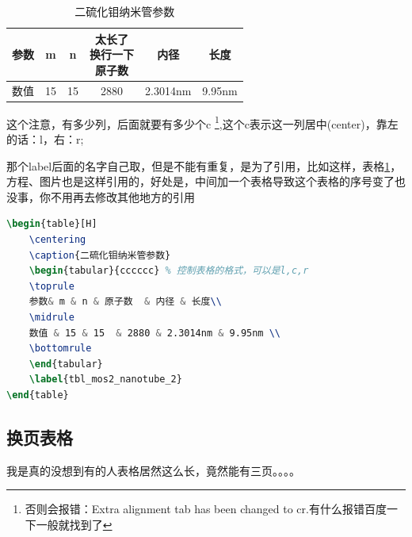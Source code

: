 \documentclass[AutoFakeBold]{LZUThesis2007}
\begin{document}
\begin{table}[H]
    \centering
    \caption{二硫化钼纳米管参数}
    \begin{tabular}{cccccc} %
    \toprule
    参数& m & n & \tabincell{c}{太长了\\换行一下\\原子数}  & 内径 & 长度\\
    \midrule
    数值 & 15 & 15  & 2880 & 2.3014nm & 9.95nm \\
    \bottomrule
    \end{tabular}
    \label{tbl_mos2_nanotube}
\end{table}

这个注意，有多少列，后面就要有多少个c \footnote{否则会报错：Extra alignment tab has been changed to cr.有什么报错百度一下一般就找到了},这个c表示这一列居中(center)，靠左的话：l，右：r;

那个label后面的名字自己取，但是不能有重复，是为了引用，比如这样，表格\ref{tbl_mos2_nanotube}，方程、图片也是这样引用的，好处是，中间加一个表格导致这个表格的序号变了也没事，你不用再去修改其他地方的引用

\begin{lstlisting}[language = tex]
\begin{table}[H]
    \centering
    \caption{二硫化钼纳米管参数}
    \begin{tabular}{cccccc} % 控制表格的格式，可以是l,c,r
    \toprule
    参数& m & n & 原子数  & 内径 & 长度\\
    \midrule
    数值 & 15 & 15  & 2880 & 2.3014nm & 9.95nm \\
    \bottomrule
    \end{tabular}
    \label{tbl_mos2_nanotube_2}
\end{table}
\end{lstlisting}

\subsection{换页表格} %

我是真的没想到有的人表格居然这么长，竟然能有三页。。。。
\end{document}
